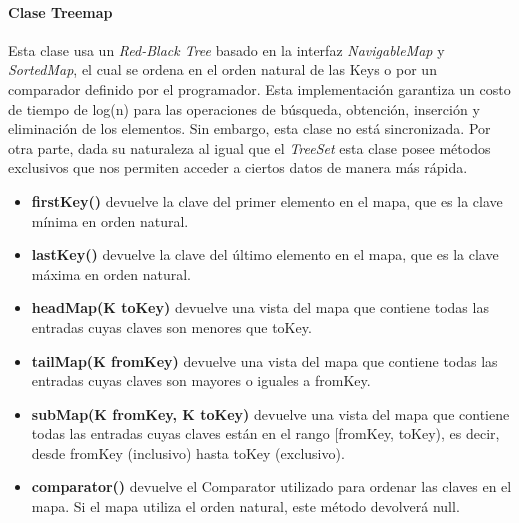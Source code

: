 \documentclass{report}
\begin{document}
\paragraph{Clase Treemap}
Esta clase usa un\textit{ Red-Black Tree} basado en la interfaz \textit{NavigableMap} y \textit{SortedMap}, el cual se ordena en el orden natural de las Keys o por un comparador definido por el programador. Esta implementación garantiza un costo de tiempo de log(n) para las operaciones de búsqueda, obtención, inserción y eliminación de los elementos. Sin embargo, esta clase no está sincronizada. Por otra parte, dada su naturaleza al igual que el \textit{TreeSet} esta clase posee métodos exclusivos que nos permiten acceder a ciertos datos de manera más rápida.
\begin{itemize}
    \item \textbf{firstKey()} devuelve la clave del primer elemento en el mapa, que es la clave mínima en orden natural.
    \item \textbf{lastKey()} devuelve la clave del último elemento en el mapa, que es la clave máxima en orden natural.
    \item \textbf{headMap(K toKey)} devuelve una vista del mapa que contiene todas las entradas cuyas claves son menores que toKey.
    \item \textbf{tailMap(K fromKey)} devuelve una vista del mapa que contiene todas las entradas cuyas claves son mayores o iguales a fromKey.
    \item \textbf{subMap(K fromKey, K toKey)} devuelve una vista del mapa que contiene todas las entradas cuyas claves están en el rango [fromKey, toKey), es decir, desde fromKey (inclusivo) hasta toKey (exclusivo).
    \item \textbf{comparator()} devuelve el Comparator utilizado para ordenar las claves en el mapa. Si el mapa utiliza el orden natural, este método devolverá null.
\end{itemize}
\end{document}
